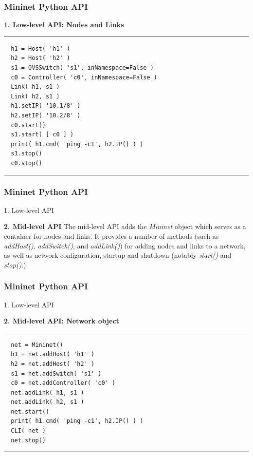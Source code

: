 \documentclass{beamer}
\begin{document}
\begin{frame}[fragile]
  \frametitle{Mininet Python API}

  \begin{block}{\textbf{1. Low-level API: Nodes and Links}}
    \rule{0.5\textwidth}{0.5pt}
    \footnotesize
\begin{verbatim}
  h1 = Host( 'h1' )
  h2 = Host( 'h2' )
  s1 = OVSSwitch( 's1', inNamespace=False )
  c0 = Controller( 'c0', inNamespace=False )
  Link( h1, s1 )
  Link( h2, s1 )
  h1.setIP( '10.1/8' )
  h2.setIP( '10.2/8' )
  c0.start()
  s1.start( [ c0 ] )
  print( h1.cmd( 'ping -c1', h2.IP() ) )
  s1.stop()
  c0.stop()
\end{verbatim}
    \rule{0.5\textwidth}{0.5pt}
  \end{block}
\end{frame}

\begin{frame}
  \frametitle{Mininet Python API}

  \begin{block}{1. Low-level API}
  \end{block}
  \begin{block}{\textbf{2. Mid-level API}}
    The mid-level API adds the \textit{Mininet} object which serves as
    a container for nodes and links. It provides a number of methods
    (such as \textit{addHost()}, \textit{addSwitch()}, and
    \textit{addLink()}) for adding nodes and links to a network, as
    well as network configuration, startup and shutdown (notably
    \textit{start()} and \textit{stop()}.)
\end{block}
\end{frame}
\begin{frame}[fragile]
  \frametitle{Mininet Python API}

  \begin{block}{1. Low-level API}
  \end{block}
  \begin{block}{\textbf{2. Mid-level API: Network object}}
    \rule{0.5\textwidth}{0.5pt}
    \footnotesize
\begin{verbatim}
  net = Mininet()
  h1 = net.addHost( 'h1' )
  h2 = net.addHost( 'h2' )
  s1 = net.addSwitch( 's1' )
  c0 = net.addController( 'c0' )
  net.addLink( h1, s1 )
  net.addLink( h2, s1 )
  net.start()
  print( h1.cmd( 'ping -c1', h2.IP() ) )
  CLI( net )
  net.stop()
\end{verbatim}
    \rule{0.5\textwidth}{0.5pt}
\end{block}
\end{frame}
\end{document}
